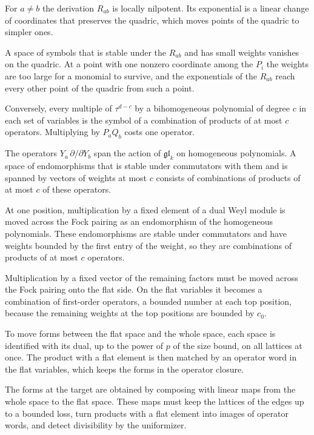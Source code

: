 For $a\neq b$ the derivation $R_{ab}$ is locally nilpotent. Its exponential is a linear change of coordinates that
preserves the quadric, which moves points of the quadric to simpler ones.

A space of symbols that is stable under the $R_{ab}$ and has small weights vanishes on the quadric. At a point with one
nonzero coordinate among the $P_i$ the weights are too large for a monomial to survive, and the exponentials of the
$R_{ab}$ reach every other point of the quadric from such a point.

Conversely, every multiple of $\tau^{d-c}$ by a bihomogeneous polynomial of degree $c$ in each set of variables is the
symbol of a combination of products of at most $c$ operators. Multiplying by $P_aQ_b$ costs one operator.

The operators $Y_a\,\partial/\partial Y_b$ span the action of $\mathfrak{gl}_k$ on homogeneous polynomials. A space of
endomorphisms that is stable under commutators with them and is spanned by vectors of weights at most $c$ consists
of combinations of products of at most $c$ of these operators.

At one position, multiplication by a fixed element of a dual Weyl module is moved across the Fock pairing as an
endomorphism of the homogeneous polynomials. These endomorphisms are stable under commutators and have weights
bounded by the first entry of the weight, so they are combinations of products of at most $c$ operators.

Multiplication by a fixed vector of the remaining factors must be moved across the Fock pairing onto the
flat side. On the flat variables it becomes a combination of first-order operators, a bounded number at each
top position, because the remaining weights at the top positions are bounded by $c_0$.

To move forms between the flat space and the whole space, each space is identified with its dual, up to
the power of $p$ of the size bound, on all lattices at once. The product with a flat element is then
matched by an operator word in the flat variables, which keeps the forms in the operator closure.

The forms at the target are obtained by composing with linear maps from the whole space to the flat space.
These maps must keep the lattices of the edges up to a bounded loss, turn products with a flat element into
images of operator words, and detect divisibility by the uniformizer.

